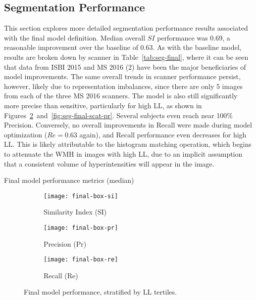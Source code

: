 \subsection{Segmentation Performance}
This section explores more detailed segmentation performance results
associated with the final model definition.
Median overall $SI$ performance was 0.69, a reasonable improvement over the baseline of 0.63.
As with the baseline model, results are broken down by scanner in Table~\ref{tab:seg-final},
where it can be seen that data from ISBI 2015 and MS 2016 (2)
have been the major beneficiaries of model improvements.
The same overall trends in scanner performance persist, however,
likely due to representation imbalances,
since there are only 5 images from each of the three MS 2016 scanners.
The model is also still significantly more precise than sensitive,
particularly for high LL, as shown in
Figures~\ref{fig:seg-final-pr}~and~\ref{fig:seg-final-scat-pr}.
Several subjects even reach near 100\% Precision.
Conversely, no overall improvements in Recall
were made during model optimization ($Re = 0.63$ again),
and Recall performance even decreases for high LL.
This is likely attributable to the histogram matching operation,
which begins to attenuate the WMH in images with high LL,
due to an implicit assumption that a consistent volume of hyperintensities will 
appear in the image.
\par
\begin{table}
  \centering
  \caption{Final model performance metrics (median)}%
  \label{tab:seg-final}
  
\end{table}
\begin{figure}
  \centering
  \begin{subfigure}{0.32\textwidth}
    \centering
    \texttt{[image: final-box-si]}
    \caption{Similarity Index (SI)}%
    \label{fig:seg-final-si}
  \end{subfigure}
  \begin{subfigure}{0.32\textwidth}
    \centering
    \texttt{[image: final-box-pr]}
    \caption{Precision (Pr)}%
    \label{fig:seg-final-pr}
  \end{subfigure}
  \begin{subfigure}{0.32\textwidth}
    \centering
    \texttt{[image: final-box-re]}
    \caption{Recall (Re)}%
    \label{fig:seg-final-re}
  \end{subfigure}
  \caption{Final model performance, stratified by LL tertiles.}%
  \label{fig:seg-final}
\end{figure}
